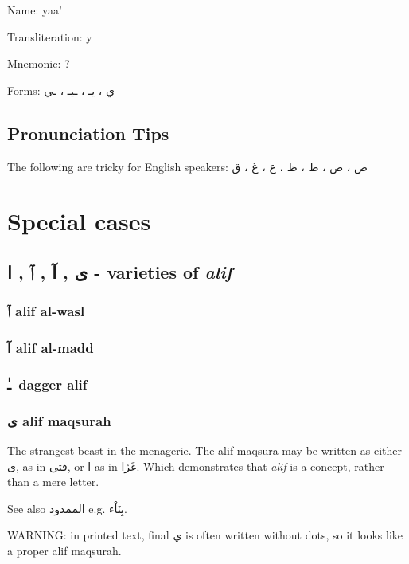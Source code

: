 \documentclass[11pt]{article}
\begin{document}
\noindent Name: yaa'

\noindent Transliteration: y

\noindent Mnemonic:  ?

\noindent Forms: \textarabic{ي ، يـ ، ـيـ ، ـي}


\subsection{Pronunciation Tips}

The following are tricky for English speakers: \textarabic{ص ، ض ، ط ،
  ظ ، ع ، غ ، ق}

\section{Special cases}

\subsection{\textarabic{ى , آ , ٱ , ا} - varieties of \textit{alif}}

\subsubsection{\textarabic{ٱ} alif al-wasl}
\subsubsection{\textarabic{آ} alif al-madd}
\subsubsection{\textarabic{ـٰ}\  dagger alif}
\subsubsection{\textarabic{ى} alif maqsurah}

The strangest beast in the menagerie. The alif maqsura may be written
as either \textarabic{ى}, as in \textarabic{فتى}, or \textarabic{ا} as
in \textarabic{غَزَا}. Which demonstrates that \textit{alif} is a
concept, rather than a mere letter.

See also \textarabic{الممدود} e.g. \textarabic{بِنَاْء}.

WARNING: in printed text, final \textarabic{ي} is often written
without dots, so it looks like a proper alif maqsurah.
\end{document}
